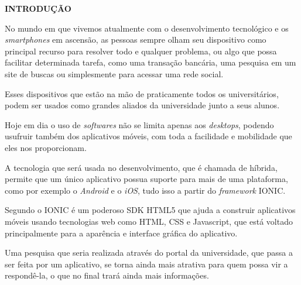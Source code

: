 \vspace{1.2em}
\textbf{\large INTRODUÇÃO}

\vspace{2.9em}
\thispagestyle{empty}


	\par No mundo em que vivemos atualmente com o desenvolvimento tecnológico e os \textit{smartphones} em ascensão, as pessoas sempre olham seu dispositivo como principal recurso para resolver todo e qualquer problema, ou algo que possa facilitar determinada tarefa, como uma transação bancária, uma pesquisa em um site de buscas ou simplesmente para acessar uma rede social.

	\par Esses dispositivos que estão na mão de praticamente todos os universitários, podem ser usados como grandes aliados da universidade junto a seus alunos.

	\par Hoje em dia o uso de \textit{softwares} não se limita apenas aos \textit{desktops}, podendo usufruir também dos aplicativos móveis, com toda a facilidade e mobilidade que eles nos proporcionam.

	\par A tecnologia que será usada no desenvolvimento, que é chamada de híbrida, permite que um único aplicativo possua suporte para mais de uma plataforma, como por exemplo o \textit{Android} e o \textit{iOS}, tudo isso a partir do \textit{framework} IONIC.

	\par Segundo  o IONIC é um poderoso SDK HTML5 que ajuda a construir aplicativos móveis usando tecnologias web como HTML, CSS e Javascript, que está voltado principalmente para a aparência e interface gráfica do aplicativo.

	\par Uma pesquisa que seria realizada através do portal da universidade, que passa a ser feita por um aplicativo, se torna ainda mais atrativa para quem possa vir a respondê-la, o que no final trará ainda mais informações.

